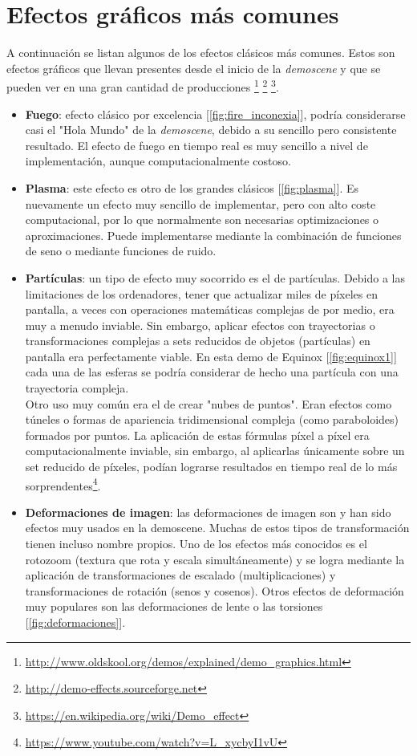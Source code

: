 \section{Efectos gráficos más comunes}

A continuación se listan algunos de los efectos clásicos más comunes. Estos son efectos gráficos que llevan presentes desde el inicio de la \emph{demoscene} y que se pueden ver en una gran cantidad de producciones \footnote{\url{http://www.oldskool.org/demos/explained/demo_graphics.html}} \footnote{\url{http://demo-effects.sourceforge.net}} \footnote{\url{https://en.wikipedia.org/wiki/Demo_effect}}.

\begin{itemize}
	\item \textbf{Fuego}: efecto clásico por excelencia [\ref{fig:fire_inconexia}], podría considerarse casi el "Hola Mundo" de la \emph{demoscene}, debido a su sencillo pero consistente resultado. El efecto de fuego en tiempo real es muy sencillo a nivel de implementación, aunque computacionalmente costoso.
	\item \textbf{Plasma}: este efecto es otro de los grandes clásicos [\ref{fig:plasma}]. Es nuevamente un efecto muy sencillo de implementar, pero con alto coste computacional, por lo que normalmente son necesarias optimizaciones o aproximaciones. Puede implementarse mediante la combinación de funciones de seno o mediante funciones de ruido.
	\item \textbf{Partículas}: un tipo de efecto muy socorrido es el de partículas. Debido a las limitaciones de los ordenadores, tener que actualizar miles de píxeles en pantalla, a veces con operaciones matemáticas complejas de por medio, era muy a menudo inviable. Sin embargo, aplicar efectos con trayectorias o transformaciones complejas a sets reducidos de objetos (partículas) en pantalla era perfectamente viable. En esta demo de Equinox [\ref{fig:equinox1}] cada una de las esferas se podría considerar de hecho una partícula con una trayectoria compleja. \\
	Otro uso muy común era el de crear "nubes de puntos". Eran efectos como túneles o formas de apariencia tridimensional compleja (como paraboloides) formados por puntos. La aplicación de estas fórmulas píxel a píxel era computacionalmente inviable, sin embargo, al aplicarlas únicamente sobre un set reducido de píxeles, podían lograrse resultados en tiempo real de lo más sorprendentes\footnote{\url{https://www.youtube.com/watch?v=L_xycbyI1vU}}.
	\item \textbf{Deformaciones de imagen}: las deformaciones de imagen son y han sido efectos muy usados en la demoscene. Muchas de estos tipos de transformación tienen incluso nombre propios. Uno de los efectos más conocidos es el rotozoom (textura que rota y escala simultáneamente) y se logra mediante la aplicación de transformaciones de escalado (multiplicaciones) y transformaciones de rotación (senos y cosenos). Otros efectos de deformación muy populares son las deformaciones de lente o las torsiones [\ref{fig:deformaciones}].

\end{itemize}
